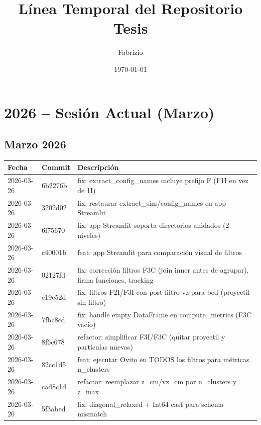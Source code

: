 \documentclass[12pt,a4paper]{article}
\title{Línea Temporal del Repositorio Tesis}
\author{Fabrizio}
\date{\today}
\begin{document}
\maketitle

\section*{2026 -- Sesión Actual (Marzo)}

\subsection*{Marzo 2026}

\begin{longtable}{@{}llp{10cm}@{}}
	\toprule
	\textbf{Fecha} & \textbf{Commit} & \textbf{Descripción}                                                                 \\
	\midrule
	2026-03-26     & 6b2276b         & fix: extract\_config\_names incluye prefijo F (F1I en vez de 1I)                     \\
	2026-03-26     & 3202d02         & fix: restaurar extract\_sim/config\_names en app Streamlit                           \\
	2026-03-26     & 6f75670         & fix: app Streamlit soporta directorios anidados (2 niveles)                          \\
	2026-03-26     & c40001b         & feat: app Streamlit para comparación visual de filtros                               \\
	2026-03-26     & 02127fd         & fix: corrección filtros F3C (join inner antes de agrupar), firma funciones, tracking \\
	2026-03-26     & e19e52d         & fix: filtros F2I/F3I con post-filtro vz para bed (proyectil sin filtro)              \\
	2026-03-26     & 7fbc8cd         & fix: handle empty DataFrame en compute\_metrics (F3C vacío)                          \\
	2026-03-26     & 8f6c678         & refactor: simplificar F3I/F3C (quitar proyectil y partículas nuevas)                 \\
	2026-03-26     & 82cc1d5         & feat: ejecutar Ovito en TODOS los filtros para métricas n\_clusters                  \\
	2026-03-26     & cad8c1d         & refactor: reemplazar z\_cm/vz\_cm por n\_clusters y z\_max                           \\
	2026-03-26     & 5f3abed         & fix: diagonal\_relaxed + Int64 cast para schema mismatch                             \\

\end{longtable}
\end{document}

